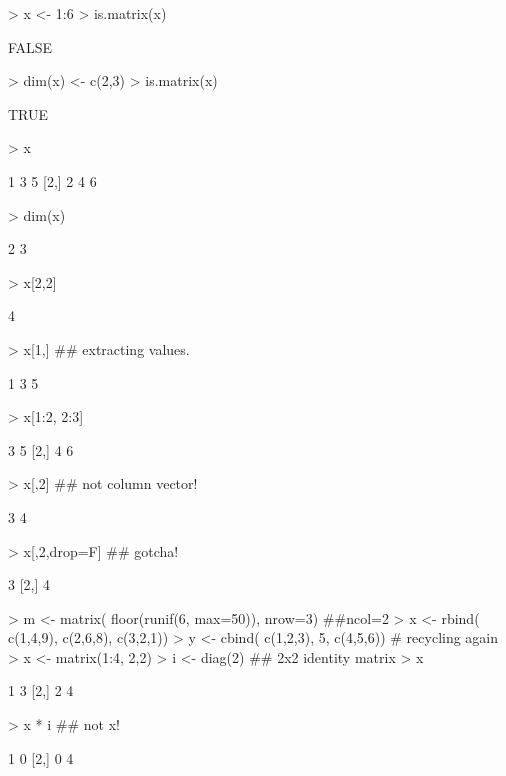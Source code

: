 \documentclass[10pt,letterpaper]{article}
\newenvironment{Schunk}{}{}
\begin{document}
\begin{Schunk}
\begin{Sinput}
> x <- 1:6
> is.matrix(x)
\end{Sinput}
\begin{Soutput}
[1] FALSE
\end{Soutput}
\begin{Sinput}
> dim(x) <- c(2,3)
> is.matrix(x)
\end{Sinput}
\begin{Soutput}
[1] TRUE
\end{Soutput}
\begin{Sinput}
> x
\end{Sinput}
\begin{Soutput}
     [,1] [,2] [,3]
[1,]    1    3    5
[2,]    2    4    6
\end{Soutput}
\begin{Sinput}
> dim(x)
\end{Sinput}
\begin{Soutput}
[1] 2 3
\end{Soutput}
\begin{Sinput}
> x[2,2]
\end{Sinput}
\begin{Soutput}
[1] 4
\end{Soutput}
\begin{Sinput}
> x[1,]                           ## extracting values.
\end{Sinput}
\begin{Soutput}
[1] 1 3 5
\end{Soutput}
\begin{Sinput}
> x[1:2, 2:3]
\end{Sinput}
\begin{Soutput}
     [,1] [,2]
[1,]    3    5
[2,]    4    6
\end{Soutput}
\begin{Sinput}
> x[,2]                           ## not column vector!
\end{Sinput}
\begin{Soutput}
[1] 3 4
\end{Soutput}
\begin{Sinput}
> x[,2,drop=F]                    ## gotcha!
\end{Sinput}
\begin{Soutput}
     [,1]
[1,]    3
[2,]    4
\end{Soutput}
\begin{Sinput}
> m <- matrix( floor(runif(6, max=50)), nrow=3) ##ncol=2
> x <- rbind( c(1,4,9), c(2,6,8), c(3,2,1))
> y <- cbind( c(1,2,3), 5, c(4,5,6))  # recycling again
> x <- matrix(1:4, 2,2)
> i <- diag(2) ## 2x2 identity matrix
> x %
\end{Sinput}
\begin{Soutput}
     [,1] [,2]
[1,]    1    3
[2,]    2    4
\end{Soutput}
\begin{Sinput}
> x  *  i      ## not x!
\end{Sinput}
\begin{Soutput}
     [,1] [,2]
[1,]    1    0
[2,]    0    4
\end{Soutput}
\end{Schunk}
\end{document}
